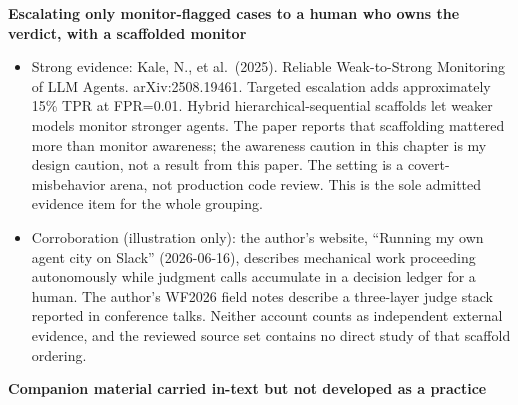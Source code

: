 \textbf{Escalating only monitor-flagged cases to a human who owns the verdict, with a scaffolded monitor}

\begin{itemize}
\tightlist
\item
  Strong evidence: Kale, N., et al.~(2025). Reliable Weak-to-Strong Monitoring of LLM Agents. arXiv:2508.19461. Targeted escalation adds approximately 15\% TPR at FPR=0.01. Hybrid hierarchical-sequential scaffolds let weaker models monitor stronger agents. The paper reports that scaffolding mattered more than monitor awareness; the awareness caution in this chapter is my design caution, not a result from this paper. The setting is a covert-misbehavior arena, not production code review. This is the sole admitted evidence item for the whole grouping.
\item
  Corroboration (illustration only): the author's website, ``Running my own agent city on Slack'' (2026-06-16), describes mechanical work proceeding autonomously while judgment calls accumulate in a decision ledger for a human. The author's WF2026 field notes describe a three-layer judge stack reported in conference talks. Neither account counts as independent external evidence, and the reviewed source set contains no direct study of that scaffold ordering.
\end{itemize}

\textbf{Companion material carried in-text but not developed as a practice}

